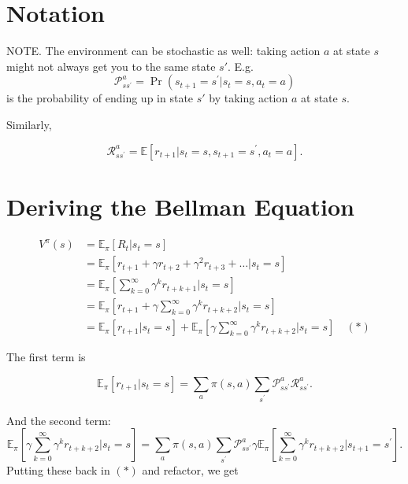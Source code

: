 \documentclass[20pt]{extarticle}
\theoremstyle{plain}
\theoremstyle{definition}
\theoremstyle{remark}
\newcommand{\0}{\varnothing}
\newcommand{\<}{\langle}
\renewcommand{\>}{\rangle}
\begin{document}
\section{Notation}


NOTE. The environment can be stochastic as well: taking action \( a \) at state \( s \) might not always get you to the same state \( s'. \) E.g.
\[
\mathcal { P } _ { s s ^ { \prime } } ^ { a } = \operatorname { Pr } \left( s _ { t + 1 } = s ^ { \prime } | s _ { t } = s , a _ { t } = a \right)
\]
is the probability of ending up in state \( s' \) by taking action \( a \) at state \( s. \)

Similarly,

\[
\mathcal { R } _ { s s ^ { \prime } } ^ { a } = \mathbb { E } \left[ r _ { t + 1 } | s _ { t } = s , s _ { t + 1 } = s ^ { \prime } , a _ { t } = a \right].
\]

\section{Deriving the Bellman Equation}

\begin{align*}
V ^ { \pi } ( s ) &= \mathbb { E } _ { \pi } \left[ R _ { t } | s _ { t } = s \right] \\
&= \mathbb { E } _ { \pi } \left[ r _ { t + 1 } + \gamma r _ { t + 2 } + \gamma ^ { 2 } r _ { t + 3 } + \ldots | s _ { t } = s \right] \\
&= \mathbb { E } _ { \pi } \left[ \sum _ { k = 0 } ^ { \infty } \gamma ^ { k } r _ { t + k + 1 } \bigg| s _ { t } = s \right] \\
&= \mathbb { E } _ { \pi } \left[ r _ { t + 1 } + \gamma \sum _ { k = 0 } ^ { \infty } \gamma ^ { k } r _ { t + k + 2 } \bigg| s _ { t } = s \right] \\
&= \mathbb { E } _ { \pi } \left[ r _ { t + 1 } | s _ { t } = s \right] + \mathbb { E } _ { \pi } \left[ \gamma \sum _ { k = 0 } ^ { \infty } \gamma ^ { k } r _ { t + k + 2 } \bigg| s _ { t } = s \right] \quad (*)
\end{align*}

The first term is

\[
\mathbb { E } _ { \pi } \left[ r _ { t + 1 } | s _ { t } = s \right] = \sum _ { a } \pi ( s , a ) \sum _ { s ^ { \prime } } \mathcal { P } _ { s s ^ { \prime } } ^ { a } \mathcal { R } _ { s s ^ { \prime } } ^ { a }.
\]

And the second term:
\small
\[
\mathbb { E } _ { \pi } \left[ \gamma \sum _ { k = 0 } ^ { \infty } \gamma ^ { k } r _ { t + k + 2 } \bigg| s _ { t } = s \right] = \sum _ { a } \pi ( s , a ) \sum _ { s ^ { \prime } } \mathcal { P } _ { s s ^ { \prime } } ^ { a } \gamma \mathbb { E } _ { \pi } \left[ \sum _ { k = 0 } ^ { \infty } \gamma ^ { k } r _ { t + k + 2 } \bigg| s _ { t + 1 } = s ^ { \prime } \right].
\]
\normalsize
Putting these back in \( (*) \) and refactor, we get
\end{document}
